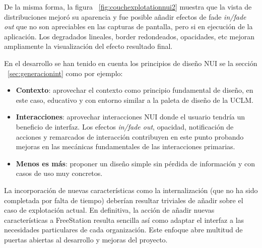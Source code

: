 De la misma forma, la figura ~\ref{fig:couchexplotationnui2} muestra que la 
vista de distribuciones mejoró su aparencia y fue posible añadir efectos de fade
\emph{in/fade out} que no son apreciables en las capturas de pantalla, pero 
si en ejecución de la aplicación. Los degradados lineales, border redondeados,
opacidades, etc mejoran ampliamente la visualización del efecto resultado final.

En el desarrollo se han tenido en cuenta los principios de diseño NUI se la
sección ~\ref{sec:generacionint} como por ejemplo:

\begin{itemize}
    \item \textbf{Contexto}: aprovechar el contexto como principio fundamental de
    diseño, en este caso, educativo y con entorno similar a la paleta de diseño de la UCLM.
    
    \item \textbf{Interacciones}: aprovechar interacciones NUI donde el usuario
    tendría un beneficio de interfaz. Los efectos \emph{in/fade out}, opacidad, notificación de acciones y
    remarcados de interacción contribuyen en este punto probando mejoras en las
    mecánicas fundamentales de las interacciones primarias.
    
    \item \textbf{Menos es más}: proponer un diseño simple sin pérdida de
    información y con casos de uso muy concretos.
\end{itemize}

\newpage

La incorporación de nuevas características como la internalización (que no ha
sido completada por falta de tiempo) deberían resultar triviales de añadir sobre
el caso de explotación actual. En definitiva, la acción de añadir nuevas
características a FreeStation resulta sencilla así como adaptar el interfaz a
las necesidades particulares de cada organización. Este enfoque abre multitud de
puertas abiertas al desarrollo y mejoras del proyecto.

\cleardoublepage